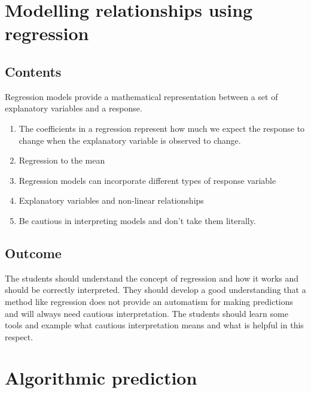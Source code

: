 \documentclass[
  letterpaper,
]{scrbook}
\providecommand{\tightlist}{%
  \setlength{\itemsep}{0pt}\setlength{\parskip}{0pt}}\usepackage{longtable,booktabs,array}
\begin{document}

\hypertarget{modelling-relationships-using-regression}{%
\chapter{Modelling relationships using
regression}\label{modelling-relationships-using-regression}}

\hypertarget{contents-4}{%
\section{Contents}\label{contents-4}}

Regression models provide a mathematical representation between a set of
explanatory variables and a response.

\begin{enumerate}
\def\labelenumi{\arabic{enumi}.}
\tightlist
\item
  The coefficients in a regression represent how much we expect the
  response to change when the explanatory variable is observed to
  change.
\item
  Regression to the mean
\item
  Regression models can incorporate different types of response variable
\item
  Explanatory variables and non-linear relationships
\item
  Be cautious in interpreting models and don't take them literally.
\end{enumerate}

\hypertarget{outcome-4}{%
\section{Outcome}\label{outcome-4}}

The students should understand the concept of regression and how it
works and should be correctly interpreted. They should develop a good
understanding that a method like regression does not provide an
automatism for making predictions and will always need cautious
interpretation. The students should learn some tools and example what
cautious interpretation means and what is helpful in this respect.


\hypertarget{algorithmic-prediction}{%
\chapter{Algorithmic prediction}\label{algorithmic-prediction}}
\end{document}
